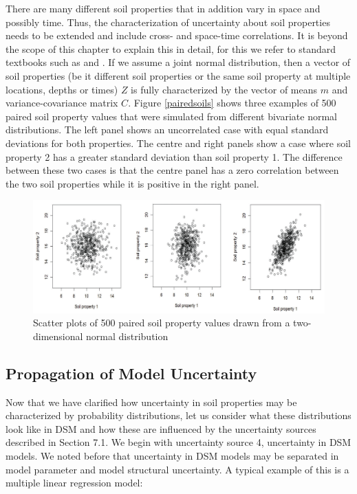 \documentclass[10pt,b5paper,]{book}
\theoremstyle{definition}
\theoremstyle{definition}
\theoremstyle{definition}
\theoremstyle{remark}
\begin{document}
There are many different soil properties that in addition vary in space
and possibly time. Thus, the characterization of uncertainty about soil
properties needs to be extended and include cross- and space-time
correlations. It is beyond the scope of this chapter to explain this in
detail, for this we refer to standard textbooks such as
\cite{goovaerts1997geostatistics} and \cite{webster_2007}. If we assume
a joint normal distribution, then a vector of soil properties (be it
different soil properties or the same soil property at multiple
locations, depths or times) \(Z\) is fully characterized by the vector
of means \(m\) and variance-covariance matrix \(C\). Figure
\ref{pairedsoils} shows three examples of 500 paired soil property
values that were simulated from different bivariate normal
distributions. The left panel shows an uncorrelated case with equal
standard deviations for both properties. The centre and right panels
show a case where soil property 2 has a greater standard deviation than
soil property 1. The difference between these two cases is that the
centre panel has a zero correlation between the two soil properties
while it is positive in the right panel.

\begin{figure}
\includegraphics[width=0.8\linewidth]{images/pairedsoilpropierties} \caption{Scatter plots of 500 paired soil property values drawn from a two-dimensional normal distribution}\label{fig:pairedsoils}
\end{figure}

\hypertarget{propagation-of-model-uncertainty}{%
\subsection{Propagation of Model
Uncertainty}\label{propagation-of-model-uncertainty}}

Now that we have clarified how uncertainty in soil properties may be
characterized by probability distributions, let us consider what these
distributions look like in DSM and how these are influenced by the
uncertainty sources described in Section 7.1. We begin with uncertainty
source 4, uncertainty in DSM models. We noted before that uncertainty in
DSM models may be separated in model parameter and model structural
uncertainty. A typical example of this is a multiple linear regression
model:
\end{document}
